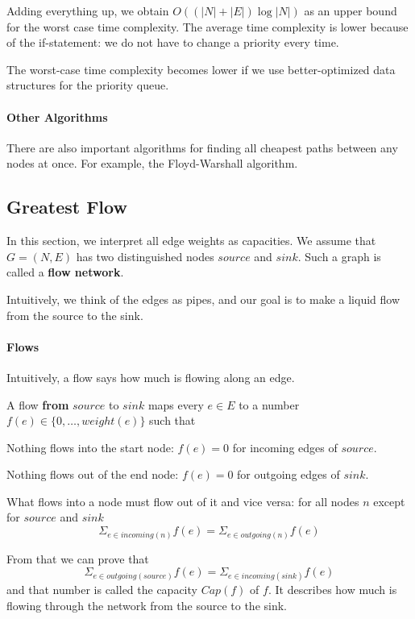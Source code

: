 Adding everything up, we obtain $O((|N|+|E|)\log|N|)$ as an upper bound for the worst case time complexity.
The average time complexity is lower because of the if-statement: we do not have to change a priority every time.

The worst-case time complexity becomes lower if we use better-optimized data structures for the priority queue.


\paragraph{Other Algorithms}
There are also important algorithms for finding all cheapest paths between any nodes at once.
For example, the Floyd-Warshall algorithm.

\subsection{Greatest Flow}\label{sec:ad:maximalflow}

In this section, we interpret all edge weights as capacities.
We assume that $G=(N,E)$ has two distinguished nodes $source$ and $sink$.
Such a graph is called a \textbf{flow network}.

Intuitively, we think of the edges as pipes, and our goal is to make a liquid flow from the source to the sink.

\paragraph{Flows}
Intuitively, a flow says how much is flowing along an edge.

A flow \textbf{from} $source$ to $sink$ maps every $e\in E$ to a number $f(e)\in \{0,\ldots,weight(e)\}$ such that
\begin{compactitem}
 \item Nothing flows into the start node: $f(e)=0$ for incoming edges of $source$.
 \item Nothing flows out of the end node: $f(e)=0$ for outgoing edges of $sink$.
 \item What flows into a node must flow out of it and vice versa: for all nodes $n$ except for $source$ and $sink$
  \[\Sigma_{e\in incoming(n)} f(e) = \Sigma_{e\in outgoing(n)} f(e)\]
\end{compactitem}

From that we can prove that
 \[\Sigma_{e\in outgoing(source)} f(e) = \Sigma_{e\in incoming(sink)} f(e)\]
and that number is called the capacity $Cap(f)$ of $f$.
It describes how much is flowing through the network from the source to the sink.

